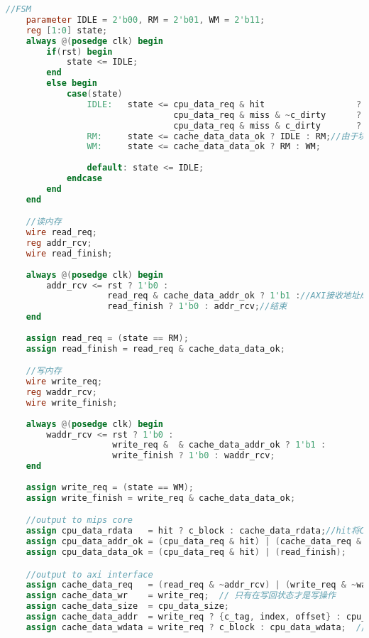 \begin{lstlisting}[language=Verilog,frame=single]
    //FSM
    parameter IDLE = 2'b00, RM = 2'b01, WM = 2'b11;
    reg [1:0] state;
    always @(posedge clk) begin
        if(rst) begin
            state <= IDLE;
        end
        else begin
            case(state)
                IDLE:   state <= cpu_data_req & hit                  ? IDLE :
                                 cpu_data_req & miss & ~c_dirty      ?   RM :
                                 cpu_data_req & miss & c_dirty       ?   WM : IDLE;//Writeback和WriteAllocate策略下的状态机
                RM:     state <= cache_data_data_ok ? IDLE : RM;//由于块只有1个字可以不用回填
                WM:     state <= cache_data_data_ok ? RM : WM;
                
                default: state <= IDLE;
            endcase
        end
    end

    //读内存
    wire read_req;
    reg addr_rcv;
    wire read_finish;
    
    always @(posedge clk) begin
        addr_rcv <= rst ? 1'b0 :
                    read_req & cache_data_addr_ok ? 1'b1 ://AXI接收地址成功
                    read_finish ? 1'b0 : addr_rcv;//结束
    end
    
    assign read_req = (state == RM);
    assign read_finish = read_req & cache_data_data_ok;

    //写内存
    wire write_req;
    reg waddr_rcv;
    wire write_finish;
    
    always @(posedge clk) begin
        waddr_rcv <= rst ? 1'b0 :
                     write_req &  & cache_data_addr_ok ? 1'b1 :
                     write_finish ? 1'b0 : waddr_rcv;
    end
    
    assign write_req = (state == WM);
    assign write_finish = write_req & cache_data_data_ok;

    //output to mips core
    assign cpu_data_rdata   = hit ? c_block : cache_data_rdata;//hit将Cache中数据发送给CPU，miss则将主存返回的数据发送给CPU
    assign cpu_data_addr_ok = (cpu_data_req & hit) | (cache_data_req & cache_data_addr_ok);
    assign cpu_data_data_ok = (cpu_data_req & hit) | (read_finish);

    //output to axi interface
    assign cache_data_req   = (read_req & ~addr_rcv) | (write_req & ~waddr_rcv);
    assign cache_data_wr    = write_req;  // 只有在写回状态才是写操作
    assign cache_data_size  = cpu_data_size;
    assign cache_data_addr  = write_req ? {c_tag, index, offset} : cpu_data_addr;//写回脏数据，读取新数据
    assign cache_data_wdata = write_req ? c_block : cpu_data_wdata;  // 写回时发送脏数据


\end{lstlisting}
